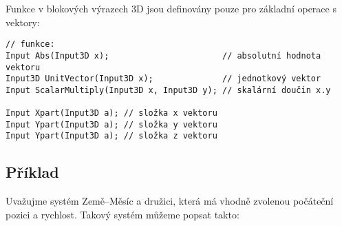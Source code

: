 \documentclass[a4paper]{article}
\begin{document}
Funkce v blokových výrazech 3D jsou definovány pouze pro základní operace s
vektory:

{
\small
\begin{verbatim}
// funkce:
Input Abs(Input3D x);                       // absolutní hodnota vektoru
Input3D UnitVector(Input3D x);              // jednotkový vektor
Input ScalarMultiply(Input3D x, Input3D y); // skalární doučin x.y

Input Xpart(Input3D a); // složka x vektoru
Input Ypart(Input3D a); // složka y vektoru
Input Ypart(Input3D a); // složka z vektoru
\end{verbatim}
}


\subsection{Příklad}

Uvažujme systém Země--Měsíc a družici, která má vhodně zvolenou počáteční
pozici a rychlost. Takový systém můžeme popsat takto:
\end{document}
